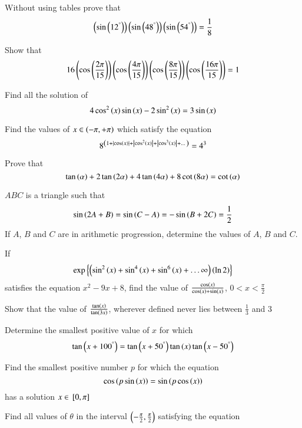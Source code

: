 \iffalse
\title{Assignment}
\author{Arjun Pavanje}
\section{subjective}
\fi
\item Without using tables prove that 
$$ 
\left(\sin\left(12^{\degree}\right)\right)\left(\sin\left(48^{\degree}\right)\right)\left(\sin\left(54^{\degree}\right)\right)= \frac{1}{8}
$$
\hfill {}
\item Show that 
$$
16\left(\cos\left(\frac{2\pi}{15}\right)\right)\left(\cos\left(\frac{4\pi}{15}\right)\right)\left(\cos\left(\frac{8\pi}{15}\right)\right)\left(\cos\left(\frac{16\pi}{15}\right)\right)=1
$$
\hfill{}
\item Find all the solution of 
$$
4\cos^2\left(x\right) \sin \left(x\right) -2\sin^2\left(x\right) = 3\sin \left(x\right)
$$
\hfill{}
\item Find the values of $x \in \left(-\pi, +\pi\right)$ which satisfy the equation
$$
8^{\left(1+\left\vert\cos \left(x\right)\right\vert+\left\vert\cos^2\left(x\right)\right\vert+\left\vert\cos^3\left(x\right)\right\vert+\dots\right)}= 4^3
$$
\hfill{}
\item Prove that 
$$
\tan \left(\alpha\right)+2\tan \left(2\alpha\right)+4\tan \left(4\alpha\right)+8\cot \left(8\alpha\right)=\cot \left(\alpha\right)
$$
\hfill{}
\item $ABC$ is a triangle such that 
$$	\sin{\ensuremath{\left(2A+B\right)}}=\sin{\ensuremath{\left(C-A\right)}}=-\sin{\ensuremath{\left(B+2C\right)}}=\frac{1}{2}
$$
If $A$, $B$ and $C$ are in arithmetic progression, determine the values of $A$, $B$ and $C$.
\hfill{}
\item If 
$$
	\exp \left\{\left(\sin^2\left(x\right)+\sin^4\left(x\right)+\sin^6\left(x\right)+\dots\infty\right)\left(\ln 2\right)\right\}
$$
satisfies the equation $x^2-9x+8$, find the value of $\frac{\cos \left(x\right)}{\cos \left(x\right) + \sin \left(x\right)}$, $0<x<\frac{\pi}{2}$
\hfill{}
\item Show that the value of  $\frac{\tan \left(x\right)}{\tan \left(3x\right)}$, wherever defined never lies between $\frac{1}{3}$ and $3$
\hfill{}
\item Determine the smallest positive value of $x$  for which 
$$
\tan {\ensuremath{\left(x+100^{\degree}\right)}}=\tan {\ensuremath{\left(x+50^{\degree}\right)}}\tan \left(x\right)\tan {\ensuremath{\left(x-50^{\degree}\right)}}
$$
\hfill{}
\item Find the smallest positive number $p$ for which the equation 
$$
\cos {\ensuremath{\left(p\sin \left(x\right)\right)}}=\sin {\ensuremath{\left(p\cos \left(x\right)\right)}}
$$
has a solution $ x \in {}\left[0, \pi\right]$
\hfill{}
\item Find all values of $\theta$ in the interval $\left(-\frac{\pi}{2},\frac{\pi}{2}\right)$ satisfying the equation 

